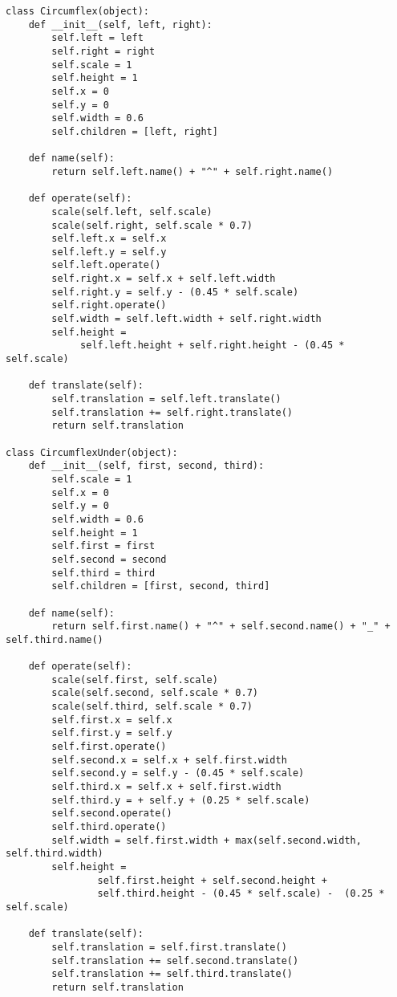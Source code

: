 \begin{verbatim}
class Circumflex(object):
    def __init__(self, left, right):
        self.left = left
        self.right = right
        self.scale = 1
        self.height = 1
        self.x = 0
        self.y = 0
        self.width = 0.6
        self.children = [left, right]

    def name(self):
        return self.left.name() + "^" + self.right.name()

    def operate(self):
        scale(self.left, self.scale)
        scale(self.right, self.scale * 0.7)
        self.left.x = self.x
        self.left.y = self.y
        self.left.operate()
        self.right.x = self.x + self.left.width
        self.right.y = self.y - (0.45 * self.scale)
        self.right.operate()
        self.width = self.left.width + self.right.width
        self.height = 
             self.left.height + self.right.height - (0.45 * self.scale)
    
    def translate(self):
        self.translation = self.left.translate()
        self.translation += self.right.translate()
        return self.translation

class CircumflexUnder(object):
    def __init__(self, first, second, third):
        self.scale = 1
        self.x = 0
        self.y = 0
        self.width = 0.6
        self.height = 1
        self.first = first
        self.second = second
        self.third = third
        self.children = [first, second, third]

    def name(self):
        return self.first.name() + "^" + self.second.name() + "_" + self.third.name()

    def operate(self):
        scale(self.first, self.scale)
        scale(self.second, self.scale * 0.7)
        scale(self.third, self.scale * 0.7)
        self.first.x = self.x
        self.first.y = self.y
        self.first.operate()
        self.second.x = self.x + self.first.width
        self.second.y = self.y - (0.45 * self.scale)
        self.third.x = self.x + self.first.width
        self.third.y = + self.y + (0.25 * self.scale)
        self.second.operate()
        self.third.operate()
        self.width = self.first.width + max(self.second.width, self.third.width)
        self.height = 
                self.first.height + self.second.height + 
                self.third.height - (0.45 * self.scale) -  (0.25 * self.scale)
    
    def translate(self):
        self.translation = self.first.translate()
        self.translation += self.second.translate()
        self.translation += self.third.translate()
        return self.translation



\end{verbatim}
